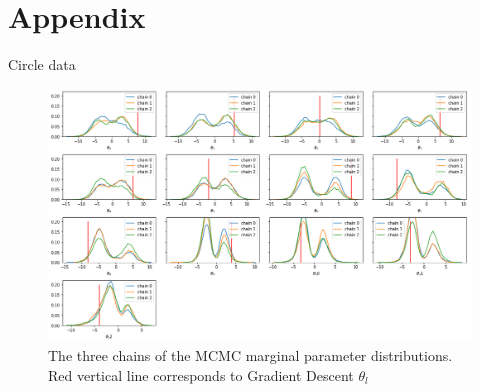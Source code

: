 \documentclass[review]{siamart190516}
\begin{document}
\section*{Appendix}
Circle data
\begin{figure}[h!]
    \centering
    \includegraphics[width = \linewidth]{Images/marg_post_circle_nn3.png}
    \caption{The three chains of the MCMC marginal parameter distributions. Red vertical line corresponds to Gradient Descent $\theta_l$}
    \label{fig:mcmc_circle}
\end{figure}
\end{document}

